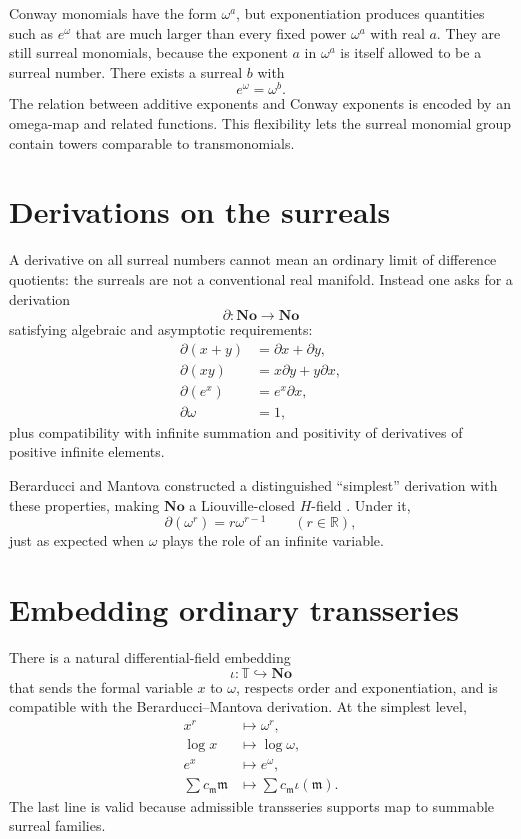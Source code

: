 \documentclass[11pt,openany]{book}
\theoremstyle{definition}
\theoremstyle{plain}
\theoremstyle{remark}
\newcommand{\R}{\mathbb{R}}
\newcommand{\T}{\mathbb{T}}
\newcommand{\m}{\mathfrak{m}}
\begin{document}
Conway monomials have the form $\omega^a$, but exponentiation produces quantities such as $e^\omega$ that are much larger than every fixed power $\omega^a$ with real $a$. They are still surreal monomials, because the exponent $a$ in $\omega^a$ is itself allowed to be a surreal number. There exists a surreal $b$ with
\[
 e^\omega=\omega^b.
\]
The relation between additive exponents and Conway exponents is encoded by an omega-map and related functions. This flexibility lets the surreal monomial group contain towers comparable to transmonomials.

\section{Derivations on the surreals}

A derivative on all surreal numbers cannot mean an ordinary limit of difference quotients: the surreals are not a conventional real manifold. Instead one asks for a derivation
\[
 \partial:\mathbf{No}\to\mathbf{No}
\]
satisfying algebraic and asymptotic requirements:
\begin{align*}
 \partial(x+y)&=\partial x+\partial y,\\
 \partial(xy)&=x\partial y+y\partial x,\\
 \partial(e^x)&=e^x\partial x,\\
 \partial\omega&=1,
\end{align*}
plus compatibility with infinite summation and positivity of derivatives of positive infinite elements.

Berarducci and Mantova constructed a distinguished ``simplest'' derivation with these properties, making $\mathbf{No}$ a Liouville-closed $H$-field \cite{berarducci-mantova-derivation}. Under it,
\[
 \partial(\omega^r)=r\omega^{r-1}
 \qquad(r\in\R),
\]
just as expected when $\omega$ plays the role of an infinite variable.

\section{Embedding ordinary transseries}

There is a natural differential-field embedding
\begin{equation}\label{eq:transseries-surreal-embedding}
 \iota:\T\hookrightarrow\mathbf{No}
\end{equation}
that sends the formal variable $x$ to $\omega$, respects order and exponentiation, and is compatible with the Berarducci--Mantova derivation. At the simplest level,
\begin{align*}
 x^r&\longmapsto\omega^r,\\
 \log x&\longmapsto\log\omega,\\
 e^x&\longmapsto e^\omega,\\
 \sum c_\m\m&\longmapsto\sum c_\m\iota(\m).
\end{align*}
The last line is valid because admissible transseries supports map to summable surreal families.
\end{document}
